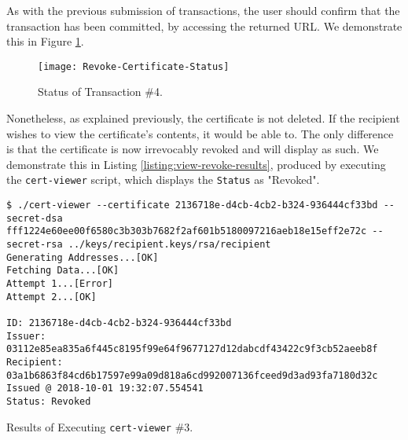 As with the previous submission of transactions, the user should confirm that the transaction has been committed, by accessing the returned URL. We demonstrate this in Figure \ref{fig:revoke-status}.

\begin{figure}[htb]
	\centering
	\texttt{[image: Revoke-Certificate-Status]}
	\caption{Status of Transaction \#4.}
	\label{fig:revoke-status}
\end{figure}

Nonetheless, as explained previously, the certificate is not deleted. If the recipient wishes to view the certificate's contents, it would be able to. The only difference is that the certificate is now irrevocably revoked and will display as such. We demonstrate this in Listing \ref{listing:view-revoke-results}, produced by executing the \texttt{cert-viewer} script, which displays the \texttt{Status} as "Revoked".

\begin{listing}[ht]
	\begin{verbatim}
$ ./cert-viewer --certificate 2136718e-d4cb-4cb2-b324-936444cf33bd --secret-dsa fff1224e60ee00f6580c3b303b7682f2af601b5180097216aeb18e15eff2e72c --secret-rsa ../keys/recipient.keys/rsa/recipient
Generating Addresses...[OK]
Fetching Data...[OK]
Attempt 1...[Error]
Attempt 2...[OK]

ID: 2136718e-d4cb-4cb2-b324-936444cf33bd
Issuer: 03112e85ea835a6f445c8195f99e64f9677127d12dabcdf43422c9f3cb52aeeb8f
Recipient: 03a1b6863f84cd6b17597e99a09d818a6cd992007136fceed9d3ad93fa7180d32c
Issued @ 2018-10-01 19:32:07.554541
Status: Revoked

\end{verbatim}
	\caption{Results of Executing \texttt{cert-viewer} \#3.}
	\label{listing:view-revoke-results}
\end{listing}
